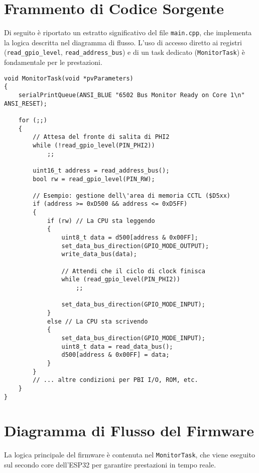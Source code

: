 \documentclass[12pt, a4paper]{article}
\begin{document}
\section{Frammento di Codice Sorgente}
Di seguito è riportato un estratto significativo del file \texttt{main.cpp}, che implementa la logica descritta nel diagramma di flusso. L'uso di accesso diretto ai registri (\texttt{read\_gpio\_level}, \texttt{read\_address\_bus}) e di un task dedicato (\texttt{MonitorTask}) è fondamentale per le prestazioni.

\begin{lstlisting}[style=cppstyle, caption={Estratto dal MonitorTask in main.cpp}, label=code:monitor_task]
void MonitorTask(void *pvParameters)
{
    serialPrintQueue(ANSI_BLUE "6502 Bus Monitor Ready on Core 1\n" ANSI_RESET);

    for (;;)
    {
        // Attesa del fronte di salita di PHI2
        while (!read_gpio_level(PIN_PHI2))
            ;;

        uint16_t address = read_address_bus();
        bool rw = read_gpio_level(PIN_RW);

        // Esempio: gestione dell\'area di memoria CCTL ($D5xx)
        if (address >= 0xD500 && address <= 0xD5FF)
        {
            if (rw) // La CPU sta leggendo
            {
                uint8_t data = d500[address & 0x00FF];
                set_data_bus_direction(GPIO_MODE_OUTPUT);
                write_data_bus(data);
                
                // Attendi che il ciclo di clock finisca
                while (read_gpio_level(PIN_PHI2))
                    ;;
                
                set_data_bus_direction(GPIO_MODE_INPUT);
            }
            else // La CPU sta scrivendo
            {
                set_data_bus_direction(GPIO_MODE_INPUT);
                uint8_t data = read_data_bus();
                d500[address & 0x00FF] = data;
            }
        }
        // ... altre condizioni per PBI I/O, ROM, etc.
    }
}
\end{lstlisting}

\section{Diagramma di Flusso del Firmware}
La logica principale del firmware è contenuta nel \texttt{MonitorTask}, che viene eseguito sul secondo core dell'ESP32 per garantire prestazioni in tempo reale.
\end{document}
